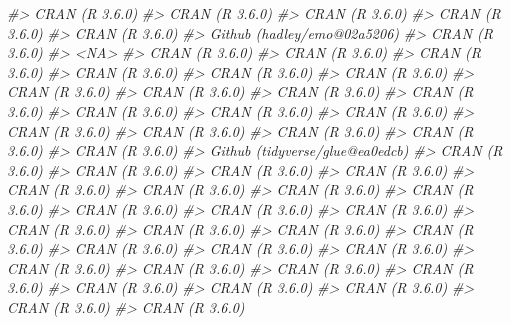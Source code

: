 \documentclass[]{krantz}
\makeatletter
\newenvironment{Shaded}{\begin{snugshade}}{\end{snugshade}}
\newcommand{\CommentTok}[1]{\textcolor[rgb]{0.37,0.37,0.37}{\textit{#1}}}
\newenvironment{kframe}{%
\medskip{}
\setlength{\fboxsep}{.8em}
 \def\at@end@of@kframe{}%
 \ifinner\ifhmode%
  \def\at@end@of@kframe{\end{minipage}}%
  \begin{minipage}{\columnwidth}%
 \fi\fi%
 \def\FrameCommand##1{\hskip\@totalleftmargin \hskip-\fboxsep
 \colorbox{shadecolor}{##1}\hskip-\fboxsep
     \hskip-\linewidth \hskip-\@totalleftmargin \hskip\columnwidth}%
 \MakeFramed {\advance\hsize-\width
   \@totalleftmargin\z@ \linewidth\hsize
   \@setminipage}}%
 {\par\unskip\endMakeFramed%
 \at@end@of@kframe}
\renewenvironment{Shaded}{\begin{kframe}}{\end{kframe}}
\makeatother
\begin{document}
\begin{Shaded}
\begin{Highlighting}[]
\CommentTok{#>  CRAN (R 3.6.0)                 }
\CommentTok{#>  CRAN (R 3.6.0)                 }
\CommentTok{#>  CRAN (R 3.6.0)                 }
\CommentTok{#>  CRAN (R 3.6.0)                 }
\CommentTok{#>  CRAN (R 3.6.0)                 }
\CommentTok{#>  Github (hadley/emo@02a5206)    }
\CommentTok{#>  CRAN (R 3.6.0)                 }
\CommentTok{#>  <NA>                           }
\CommentTok{#>  CRAN (R 3.6.0)                 }
\CommentTok{#>  CRAN (R 3.6.0)                 }
\CommentTok{#>  CRAN (R 3.6.0)                 }
\CommentTok{#>  CRAN (R 3.6.0)                 }
\CommentTok{#>  CRAN (R 3.6.0)                 }
\CommentTok{#>  CRAN (R 3.6.0)                 }
\CommentTok{#>  CRAN (R 3.6.0)                 }
\CommentTok{#>  CRAN (R 3.6.0)                 }
\CommentTok{#>  CRAN (R 3.6.0)                 }
\CommentTok{#>  CRAN (R 3.6.0)                 }
\CommentTok{#>  CRAN (R 3.6.0)                 }
\CommentTok{#>  CRAN (R 3.6.0)                 }
\CommentTok{#>  CRAN (R 3.6.0)                 }
\CommentTok{#>  CRAN (R 3.6.0)                 }
\CommentTok{#>  CRAN (R 3.6.0)                 }
\CommentTok{#>  CRAN (R 3.6.0)                 }
\CommentTok{#>  CRAN (R 3.6.0)                 }
\CommentTok{#>  CRAN (R 3.6.0)                 }
\CommentTok{#>  Github (tidyverse/glue@ea0edcb)}
\CommentTok{#>  CRAN (R 3.6.0)                 }
\CommentTok{#>  CRAN (R 3.6.0)                 }
\CommentTok{#>  CRAN (R 3.6.0)                 }
\CommentTok{#>  CRAN (R 3.6.0)                 }
\CommentTok{#>  CRAN (R 3.6.0)                 }
\CommentTok{#>  CRAN (R 3.6.0)                 }
\CommentTok{#>  CRAN (R 3.6.0)                 }
\CommentTok{#>  CRAN (R 3.6.0)                 }
\CommentTok{#>  CRAN (R 3.6.0)                 }
\CommentTok{#>  CRAN (R 3.6.0)                 }
\CommentTok{#>  CRAN (R 3.6.0)                 }
\CommentTok{#>  CRAN (R 3.6.0)                 }
\CommentTok{#>  CRAN (R 3.6.0)                 }
\CommentTok{#>  CRAN (R 3.6.0)                 }
\CommentTok{#>  CRAN (R 3.6.0)                 }
\CommentTok{#>  CRAN (R 3.6.0)                 }
\CommentTok{#>  CRAN (R 3.6.0)                 }
\CommentTok{#>  CRAN (R 3.6.0)                 }
\CommentTok{#>  CRAN (R 3.6.0)                 }
\CommentTok{#>  CRAN (R 3.6.0)                 }
\CommentTok{#>  CRAN (R 3.6.0)                 }
\CommentTok{#>  CRAN (R 3.6.0)                 }
\CommentTok{#>  CRAN (R 3.6.0)                 }
\CommentTok{#>  CRAN (R 3.6.0)                 }
\CommentTok{#>  CRAN (R 3.6.0)                 }
\CommentTok{#>  CRAN (R 3.6.0)                 }
\CommentTok{#>  CRAN (R 3.6.0)                 }

\end{Highlighting}
\end{Shaded}
\end{document}

